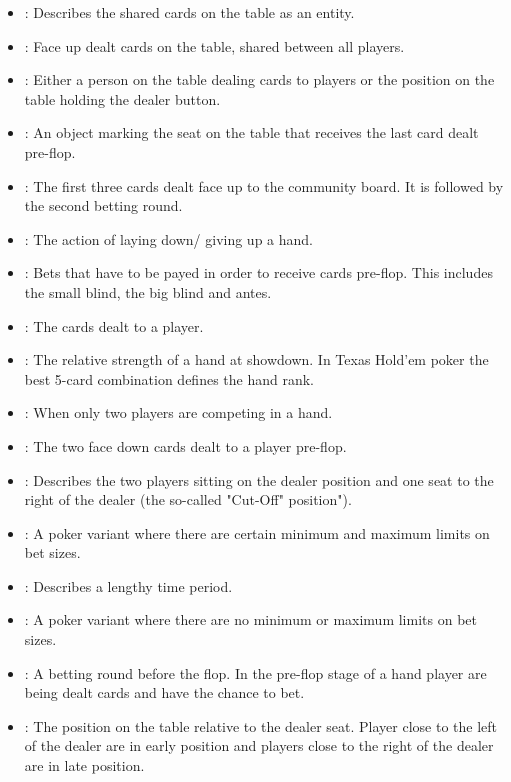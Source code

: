 \begin{appendices}
\begin{itemize}
\item {}:
Describes the shared cards on the table as an entity.
\item {}:
Face up dealt cards on the table, shared between all players.
\item {}:
Either a person on the table dealing cards to players or the position on the table holding the dealer button.
\item {}:
An object marking the seat on the table that receives the last card dealt pre-flop. 
\item {}: The first three cards dealt face up to the community board. It  is followed by the second betting round.
\item {}: 
The action of laying down/ giving up a hand.
\item {}:
Bets that have to be payed in order to receive cards pre-flop. This includes the small blind, the big blind and antes.
\item {}:
The cards dealt to a player.
\item {}:
The relative strength of a hand at showdown. In Texas Hold'em poker the best 5-card combination defines the hand rank.
\item {}:
When only two players are competing in a hand.
\item {}:
The two face down cards dealt to a player pre-flop.
\item {}:
Describes the two players sitting on the dealer position and one seat to the right of the dealer (the so-called "Cut-Off" position").
\item {}:
A poker variant where there are certain minimum and maximum limits on bet sizes.
\item {}:
Describes a lengthy time period.
\item {}:
A poker variant where there are no minimum or maximum limits on bet sizes.
\item {}:
A betting round before the flop. In the pre-flop stage of a hand player are being dealt cards and have the chance to bet.
\item {}:
The position on the table relative to the dealer seat. Player close to the left of the dealer are in early position and players close to the right of the dealer are in late position.

\end{itemize}
\end{appendices}
